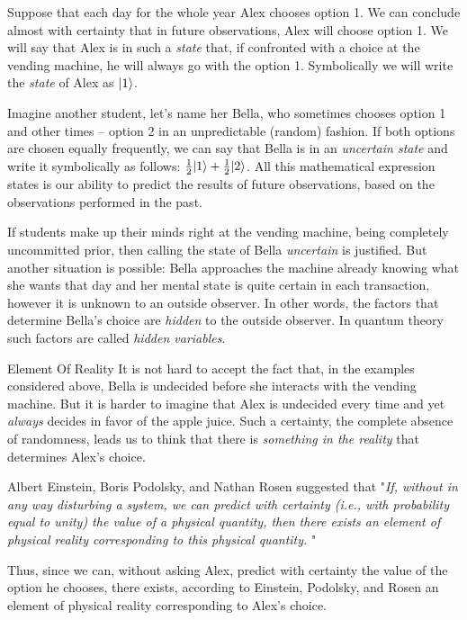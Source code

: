 Suppose that each day for the whole year Alex chooses option 1. We can conclude almost with certainty that in future observations, Alex will choose option 1. We will say that Alex is in such a \emph{state} that, if confronted with a choice at the vending machine, he will always go with the option 1. Symbolically we will write the \emph{state} of Alex as $|{1}\rangle$.

Imagine another student, let's name her Bella, who sometimes chooses option 1 and other times -- option 2 in an unpredictable (random) fashion. If both options are chosen equally frequently, we can say that Bella is in an \emph{uncertain state} and write it symbolically as follows: $\frac{1}{2}|{1}\rangle+\frac{1}{2}|{2}\rangle$. All this mathematical expression states is our ability to predict the results of future observations, based on the observations performed in the past.

If students make up their minds right at the vending machine, being completely uncommitted prior, then calling the state of Bella \emph{uncertain} is justified. But another situation is possible: Bella approaches the machine already knowing what she wants that day and her mental state is quite certain in each transaction, however it is unknown to an outside observer. In other words, the factors that determine Bella's choice are \emph{hidden} to the outside observer. In quantum theory such factors are called \emph{hidden variables}.

\begin{mybio}{Element Of Reality}
	It is not hard to accept the fact that, in the examples considered above, Bella is undecided before she interacts with the vending machine. But it is harder to imagine that Alex is undecided every time and yet \emph{always} decides in favor of the apple juice. Such a certainty, the complete absence of randomness, leads us to think that there is \emph{something in the reality} that determines Alex's choice.
	
	Albert Einstein, Boris Podolsky, and Nathan Rosen suggested that
	"{\it If, without in any way disturbing a system, we can predict with certainty (i.e., with probability equal to unity) the value of a physical quantity, then there exists an element of physical reality corresponding to this physical quantity. }"
	
	Thus, since we can, without asking Alex, predict with certainty the value of the option he chooses, there exists, according to Einstein, Podolsky, and Rosen an element of physical reality corresponding to Alex's choice.
\end{mybio}

